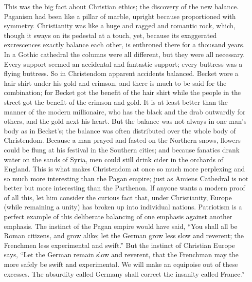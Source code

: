 \documentclass{book}
\begin{document}
This was the big fact about Christian ethics; the discovery of the new balance. Paganism had been like a pillar of marble, upright because proportioned with symmetry. Christianity was like a huge and ragged and romantic rock, which, though it sways on its pedestal at a touch, yet, because its exaggerated excrescences exactly balance each other, is enthroned there for a thousand years. In a Gothic cathedral the columns were all different, but they were all necessary. Every support seemed an accidental and fantastic support; every buttress was a flying buttress. So in Christendom apparent accidents balanced. Becket wore a hair shirt under his gold and crimson, and there is much to be said for the combination; for Becket got the benefit of the hair shirt while the people in the street got the benefit of the crimson and gold. It is at least better than the manner of the modern millionaire, who has the black and the drab outwardly for others, and the gold next his heart. But the balance was not always in one man’s body as in Becket’s; the balance was often distributed over the whole body of Christendom. Because a man prayed and fasted on the Northern snows, flowers could be flung at his festival in the Southern cities; and because fanatics drank water on the sands of Syria, men could still drink cider in the orchards of England. This is what makes Christendom at once so much more perplexing and so much more interesting than the Pagan empire; just as Amiens Cathedral is not better but more interesting than the Parthenon. If anyone wants a modern proof of all this, let him consider the curious fact that, under Christianity, Europe (while remaining a unity) has broken up into individual nations. Patriotism is a perfect example of this deliberate balancing of one emphasis against another emphasis. The instinct of the Pagan empire would have said, “You shall all be Roman citizens, and grow alike; let the German grow less slow and reverent; the Frenchmen less experimental and swift.” But the instinct of Christian Europe says, “Let the German remain slow and reverent, that the Frenchman may the more safely be swift and experimental. We will make an equipoise out of these excesses. The absurdity called Germany shall correct the insanity called France.”
\end{document}
